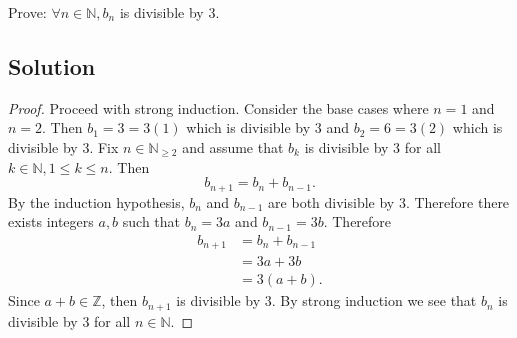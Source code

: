 \documentclass[12pt]{extarticle}
\begin{document}
Prove: $\forall n \in \mathbb{N}, b_n$ is divisible by $3$.

\subsection*{Solution}

\begin{proof}
	Proceed with strong induction. Consider the base cases where $n = 1$ and $n = 2$. Then $b_1 = 3 = 3(1)$ which is divisible by $3$ and $b_2 = 6 = 3(2)$ which is divisible by $3$. Fix $n \in \mathbb{N}_{\geq 2}$ and assume that $b_k$ is divisible by $3$ for all $ k \in \mathbb{N}, 1 \leq k \leq n$. Then
	\[
		b_{n+1} = b_{n} + b_{n - 1}
	.\]
	By the induction hypothesis, $b_n$ and $b_{n-1}$ are both divisible by $3$. Therefore there exists integers $a,b$ such that $b_n = 3a$ and $b_{n-1} = 3b$. Therefore
	\begin{align*}
		b_{n+1} &= b_n + b_{n-1} \\
						&= 3a + 3b \\
						&= 3(a + b)
	.\end{align*}
	Since $a + b \in \mathbb{Z}$, then $b_{n+1}$ is divisible by $3$. By strong induction we see that $b_n$ is divisible by $3$ for all $n \in \mathbb{N}$.
\end{proof}
\end{document}
